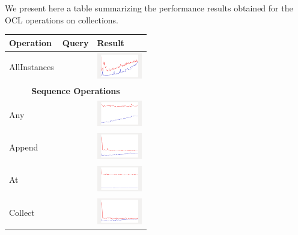 We present here a table summarizing the performance results obtained for the OCL
operations on collections.


\begin{longtable}{ m{2.5cm} m{8cm} m{2cm} }
  Operation & Query & Result \\\hline
  AllInstances && 
  	\includegraphics[width=2cm]{graphs/AllInstances}
  \\\hline
  \multicolumn{3}{c}{{\bf Sequence Operations}}\\\hline
  
  Any &
  
  & 
  	\includegraphics[width=2cm]{graphs/sequence/small/Any}
  \\\hline
  
  Append &
  
  & 
  	\includegraphics[width=2cm]{graphs/sequence/small/Append}
  \\\hline
  
  At &
  
  & 
  \includegraphics[width=2cm]{graphs/sequence/small/At}
\\\hline

Collect &

&
\includegraphics[width=2cm]{graphs/sequence/small/Collect}
\\\hline


\end{longtable}
